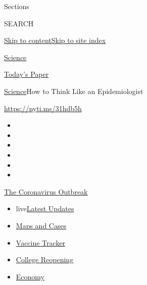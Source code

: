 Sections

SEARCH

\protect\hyperlink{site-content}{Skip to
content}\protect\hyperlink{site-index}{Skip to site index}

\href{https://www.nytimes3xbfgragh.onion/section/science}{Science}

\href{https://myaccount.nytimes3xbfgragh.onion/auth/login?response_type=cookie\&client_id=vi}{}

\href{https://www.nytimes3xbfgragh.onion/section/todayspaper}{Today's
Paper}

\href{/section/science}{Science}\textbar{}How to Think Like an
Epidemiologist

\url{https://nyti.ms/31hdb5h}

\begin{itemize}
\item
\item
\item
\item
\item
\item
\end{itemize}

\href{https://www.nytimes3xbfgragh.onion/news-event/coronavirus?action=click\&pgtype=Article\&state=default\&region=TOP_BANNER\&context=storylines_menu}{The
Coronavirus Outbreak}

\begin{itemize}
\tightlist
\item
  live\href{https://www.nytimes3xbfgragh.onion/2020/08/04/world/coronavirus-cases.html?action=click\&pgtype=Article\&state=default\&region=TOP_BANNER\&context=storylines_menu}{Latest
  Updates}
\item
  \href{https://www.nytimes3xbfgragh.onion/interactive/2020/us/coronavirus-us-cases.html?action=click\&pgtype=Article\&state=default\&region=TOP_BANNER\&context=storylines_menu}{Maps
  and Cases}
\item
  \href{https://www.nytimes3xbfgragh.onion/interactive/2020/science/coronavirus-vaccine-tracker.html?action=click\&pgtype=Article\&state=default\&region=TOP_BANNER\&context=storylines_menu}{Vaccine
  Tracker}
\item
  \href{https://www.nytimes3xbfgragh.onion/2020/08/02/us/covid-college-reopening.html?action=click\&pgtype=Article\&state=default\&region=TOP_BANNER\&context=storylines_menu}{College
  Reopening}
\item
  \href{https://www.nytimes3xbfgragh.onion/live/2020/08/04/business/stock-market-today-coronavirus?action=click\&pgtype=Article\&state=default\&region=TOP_BANNER\&context=storylines_menu}{Economy}
\end{itemize}


